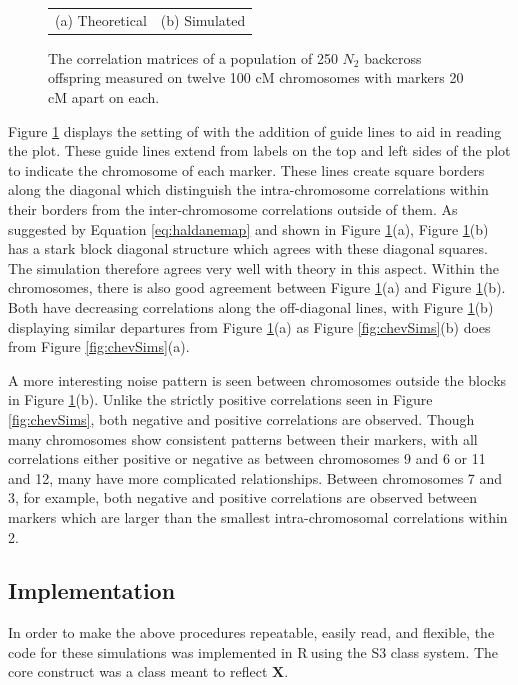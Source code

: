 \documentclass[12pt]{article}
\newcommand*{\R}{\textsf{R}$~$}
\newcommand{\m}[1]{\mathbf{#1}}               %
\begin{document}
\begin{figure}[h!]
\begin{center}
\begin{tabular}{cc}
      {\footnotesize (a) Theoretical} &
      {\footnotesize (b) Simulated} \\
    \end{tabular}
  \end{center}
  \caption{The correlation matrices of a population of 250 $N_2$ backcross offspring measured on twelve 100 cM chromosomes with markers 20 cM apart on each.}
  \label{fig:LBSims}
\end{figure}

Figure \ref{fig:LBSims} displays the setting of \cite{LanderBotstein1989} with the addition of guide lines to aid in reading the plot. These guide lines extend from labels on the top and left sides of the plot to indicate the chromosome of each marker. These lines create square borders along the diagonal which distinguish the intra-chromosome correlations within their borders from the inter-chromosome correlations outside of them. As suggested by Equation \ref{eq:haldanemap} and shown in Figure \ref{fig:LBSims}(a), Figure \ref{fig:LBSims}(b) has a stark block diagonal structure which agrees with these diagonal squares. The simulation therefore agrees very well with theory in this aspect. Within the chromosomes, there is also good agreement between Figure \ref{fig:LBSims}(a) and Figure \ref{fig:LBSims}(b). Both have decreasing correlations along the off-diagonal lines, with Figure \ref{fig:LBSims}(b) displaying similar departures from Figure \ref{fig:LBSims}(a) as Figure \ref{fig:chevSims}(b) does from Figure \ref{fig:chevSims}(a).

A more interesting noise pattern is seen between chromosomes outside the blocks in Figure \ref{fig:LBSims}(b). Unlike the strictly positive correlations seen in Figure \ref{fig:chevSims}, both negative and positive correlations are observed. Though many chromosomes show consistent patterns between their markers, with all correlations either positive or negative as between chromosomes 9 and 6 or 11 and 12, many have more complicated relationships. Between chromosomes 7 and 3, for example, both negative and positive correlations are observed between markers which are larger than the smallest intra-chromosomal correlations within 2.

\subsection{Implementation}

In order to make the above procedures repeatable, easily read, and flexible, the code for these simulations was implemented in \R using the S3 class system. The core construct was a class meant to reflect $\m{X}$.
\end{document}
